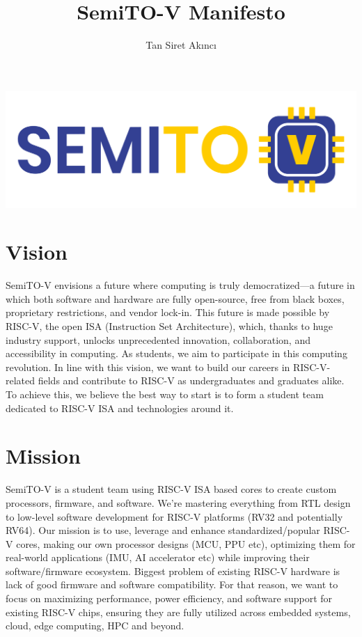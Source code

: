 \documentclass{article}
\title{SemiTO-V Manifesto}
\author{Tan Siret Akıncı}
\date
\begin{document}
\maketitle
\begin{center}
    \includegraphics[scale=0.7]{semito-v_logo.png}
\end{center}
\maketitle

\section{Vision}

SemiTO-V envisions a future where computing is truly democratized—a future in which both software and hardware are fully open-source, free from black boxes, proprietary restrictions, and vendor lock-in. This future is made possible by RISC-V, the open ISA (Instruction Set Architecture), which, thanks to huge industry support, unlocks unprecedented innovation, collaboration, and accessibility in computing. As students, we aim to participate in this computing revolution. In line with this vision, we want to build our careers in RISC-V-related fields and contribute to RISC-V as undergraduates and graduates alike. To achieve this, we believe the best way to start is to form a student team dedicated to RISC-V ISA and technologies around it.


\section{Mission}
SemiTO-V is a student team using RISC-V ISA based cores to create custom processors, firmware, and software. We’re mastering everything from RTL design to low-level software development for RISC-V platforms (RV32 and potentially RV64). Our mission is to use, leverage and enhance standardized/popular RISC-V cores, making our own processor designs (MCU, PPU etc), optimizing them for real-world applications (IMU, AI accelerator etc) while improving their software/firmware ecosystem. Biggest problem of existing RISC-V hardware is lack of good firmware and software compatibility. For that reason, we want to focus on maximizing performance, power efficiency, and software support for existing RISC-V chips, ensuring they are fully utilized across embedded systems, cloud, edge computing, HPC and beyond.
\end{document}
